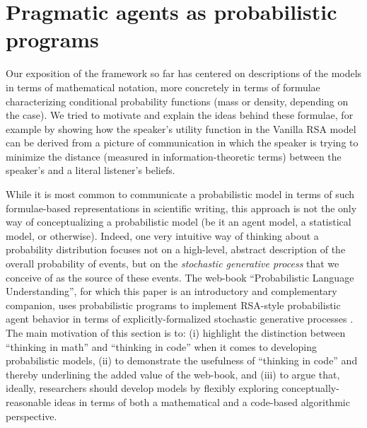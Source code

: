 \documentclass{sp}
\newcommand{\gcs}[1]{\textcolor{blue}{[gcs: #1]}}
\newcommand{\mht}[1]{\textcolor{purple}{[mht: #1]}}
\begin{document}
%

\section{Pragmatic agents as probabilistic programs} \label{prob-programs}

Our exposition of the framework so far has centered on descriptions of the models in terms of mathematical notation, more concretely in terms of formulae characterizing conditional probability functions (mass or density, depending on the case).
We tried to motivate and explain the ideas behind these formulae, for example by showing how the speaker's utility function in the Vanilla RSA model can be derived from a picture of communication in which the speaker is trying to minimize the distance (measured in information-theoretic terms) between the speaker's and a literal listener's beliefs.

While it is most common to communicate a probabilistic model in terms of such formulae-based representations in scientific writing, this approach is not the only way of conceptualizing a probabilistic model (be it an agent model, a statistical model, or otherwise).
Indeed, one very intuitive way of thinking about a probability distribution focuses not on a high-level, abstract description of the overall probability of events, but on the \emph{stochastic generative process} that we conceive of as the source of these events.
The web-book ``Probabilistic Language Understanding'', for which this paper is an introductory and complementary companion, uses probabilistic programs to implement RSA-style probabilistic agent behavior in terms of explicitly-formalized stochastic generative processes \citep{problang}.
The main motivation of this section is to: (i) highlight the distinction between ``thinking in math'' and ``thinking in code'' when it comes to developing probabilistic models, (ii) to demonstrate the usefulness of ``thinking in code'' and thereby underlining the added value of the web-book, and (iii) to argue that, ideally, researchers should develop models by flexibly exploring conceptually-reasonable ideas in terms of both a mathematical and a code-based algorithmic perspective.
\end{document}
